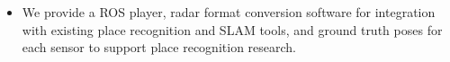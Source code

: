 
\begin{itemize}
    \item We provide a \ac{ROS} player, radar format conversion software for integration with existing place recognition and SLAM tools, and ground truth poses for each sensor to support place recognition research.
\end{itemize}

